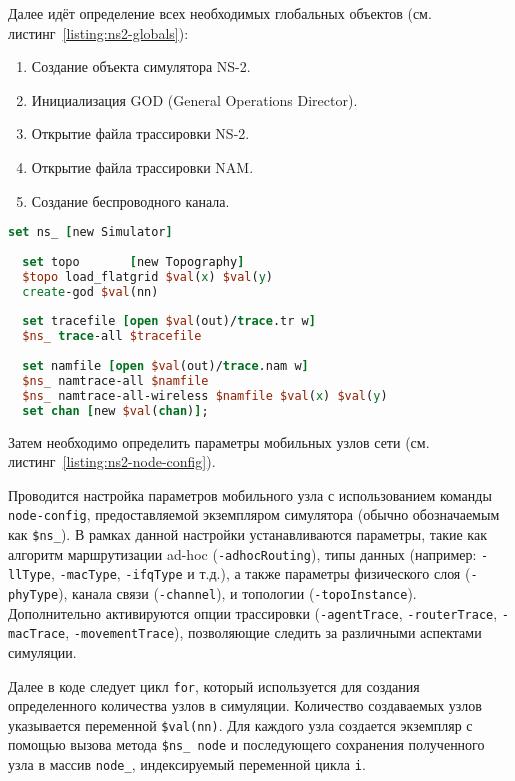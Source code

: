   Далее идёт определение всех необходимых глобальных объектов (см. листинг~\ref{listing:ns2-globals}):
  
\begin{enumerate}
    \item Создание объекта симулятора NS-2.
    \item Инициализация GOD (General Operations Director).
    \item Открытие файла трассировки NS-2.
    \item Открытие файла трассировки NAM.
    \item Создание беспроводного канала.
\end{enumerate}

\newpage
  
\begin{lstlisting}[language=tcl, style=mystyle, caption=Определение глобальных объектов в NS-2, label=listing:ns2-globals]
  set ns_ [new Simulator]
  
  set topo       [new Topography]
  $topo load_flatgrid $val(x) $val(y)
  create-god $val(nn)
  
  set tracefile [open $val(out)/trace.tr w]
  $ns_ trace-all $tracefile
  
  set namfile [open $val(out)/trace.nam w]
  $ns_ namtrace-all $namfile
  $ns_ namtrace-all-wireless $namfile $val(x) $val(y)
  set chan [new $val(chan)];
\end{lstlisting}

Затем необходимо определить параметры мобильных узлов сети (см. листинг~\ref{listing:ns2-node-config}).

Проводится настройка параметров мобильного узла с использованием команды \verb|node-config|, предоставляемой экземпляром симулятора (обычно обозначаемым как \verb|$ns_|). В рамках данной настройки устанавливаются параметры, такие как алгоритм маршрутизации ad-hoc (\verb|-adhocRouting|), типы данных (например: \verb|-llType|, \verb|-macType|, \verb|-ifqType| и т.д.), а также параметры физического слоя (\verb|-phyType|), канала связи (\verb|-channel|), и топологии (\verb|-topoInstance|). Дополнительно активируются опции трассировки (\verb|-agentTrace|, \verb|-routerTrace|, \verb|-macTrace|, \verb|-movementTrace|), позволяющие следить за различными аспектами симуляции.

Далее в коде следует цикл \verb|for|, который используется для создания определенного количества узлов в симуляции. Количество создаваемых узлов указывается переменной \verb|$val(nn)|. Для каждого узла создается экземпляр с помощью вызова метода \verb|$ns_ node| и последующего сохранения полученного узла в массив \verb|node_|, индексируемый переменной цикла \verb|i|.

